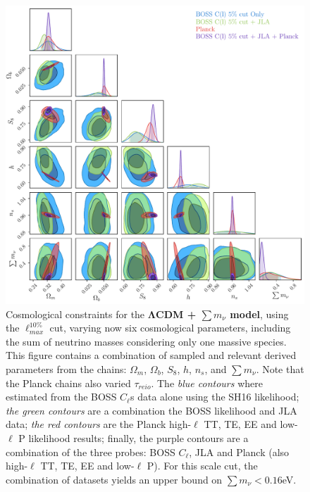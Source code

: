 \begin{figure}
\begin{center}
\includegraphics[width=\textwidth]{BOSS-FIGS/1Spec_Neutrino_NewPrior_LCDM_5pc.pdf}
\caption[Cosmological constraints for the $\Lambda$CDM + $\sum m_{\nu}$ model, using the $\ell_{max}^{10\%}$ cut]{Cosmological constraints for the \textbf{$\mathbf{\Lambda}$CDM + $\sum m_{\nu}$ model}, using the $\ell_{max}^{10\%}$ cut, varying now six cosmological parameters, including the sum of neutrino masses considering only one massive species. This figure contains a combination of sampled and relevant derived parameters from the chains: $\Omega_m$, $\Omega_b$, $S_8$, $h$, $n_s$, and $\sum m_{\nu}$. Note that the Planck chains also varied $\tau_{reio}$. The \textit{blue contours} where estimated from the BOSS $C_{\ell}$s data alone using the SH16 likelihood; \textit{the green contours} are a combination the BOSS likelihood and JLA data; \textit{the red contours} are the Planck high-$\ell$ TT, TE, EE and low-$\ell$ P likelihood results; finally, the purple contours are a combination of the three probes: BOSS $C_{\ell}$, JLA and Planck (also high-$\ell$ TT, TE, EE and low-$\ell$ P). For this scale cut, the combination of datasets yields an upper bound on $\sum m_{\nu} < 0.16$eV.}
\label{fig:nuCDM10pc}
\end{center}
\end{figure}


